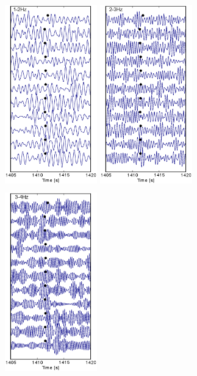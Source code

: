 \begin{figure}[!ht]
	\centering
	\includegraphics[width=4cm,height=8cm]{fig/chap3/nvar_e1_1_2.eps}
	\includegraphics[width=4cm,height=8cm]{fig/chap3/nvar_e1_2_3.eps}
	\includegraphics[width=4cm,height=8cm]{fig/chap3/nvar_e1_3_4.eps}\\

\end{figure}
